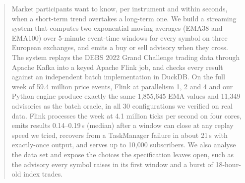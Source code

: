 \begin{abstract}
Market participants want to know, per instrument and within seconds, when a short-term trend overtakes a long-term one.
We build a streaming system that computes two exponential moving averages (EMA38 and EMA100) over 5-minute event-time windows for every symbol on three European exchanges, and emits a buy or sell advisory when they cross.
The system replays the DEBS 2022 Grand Challenge trading data through Apache Kafka into a keyed Apache Flink job, and checks every result against an independent batch implementation in DuckDB.
On the full week of 59.4 million price events, Flink at parallelism 1, 2 and 4 and our Python engine produce exactly the same 1,855,645 EMA values and 11,349 advisories as the batch oracle, in all 30 configurations we verified on real data.
Flink processes the week at 4.1 million ticks per second on four cores, emits results 0.14--0.19\,s (median) after a window can close at any replay speed we tried, recovers from a TaskManager failure in about 21\,s with exactly-once output, and serves up to 10,000 subscribers.
We also analyse the data set and expose the choices the specification leaves open, such as the advisory every symbol raises in its first window and a burst of 18-hour-old index trades.
\end{abstract}
